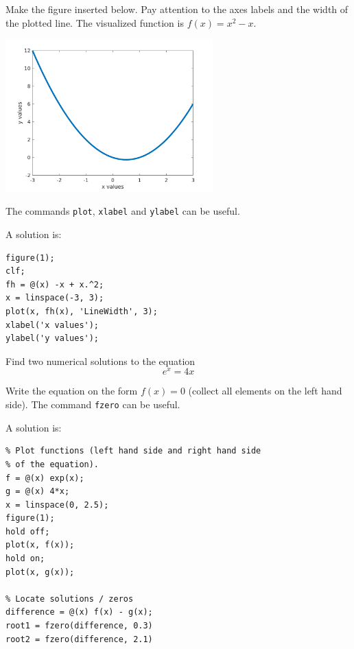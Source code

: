 \begin{ex}
Make the figure inserted below. Pay attention to the axes labels and the width of the plotted line. The visualized function is $f(x) = x^2 - x$. \par
\noindent
\includegraphics[width=8cm]{pic/plotting/basic_plotting_020.png}
\begin{hint}
The commands \verb!plot!, \verb!xlabel! and \verb!ylabel! can be useful.
\end{hint}
\begin{sol}
A solution is:
\begin{verbatim}
figure(1);
clf;
fh = @(x) -x + x.^2;
x = linspace(-3, 3);
plot(x, fh(x), 'LineWidth', 3);
xlabel('x values');
ylabel('y values');
\end{verbatim}
\end{sol}
\end{ex}


\begin{ex}
Find two numerical solutions to the equation
\[
e^{x} = 4x
\]
\begin{hint}
Write the equation on the form $f(x) = 0$ (collect all elements on the left hand side).
The command \verb!fzero! can be useful.
\end{hint}
\begin{sol}
A solution is:
\begin{verbatim}
% Plot functions (left hand side and right hand side 
% of the equation).
f = @(x) exp(x);
g = @(x) 4*x;
x = linspace(0, 2.5);
figure(1);
hold off;
plot(x, f(x));
hold on;
plot(x, g(x));

% Locate solutions / zeros
difference = @(x) f(x) - g(x);
root1 = fzero(difference, 0.3)
root2 = fzero(difference, 2.1)
\end{verbatim}
\end{sol}
\end{ex}



